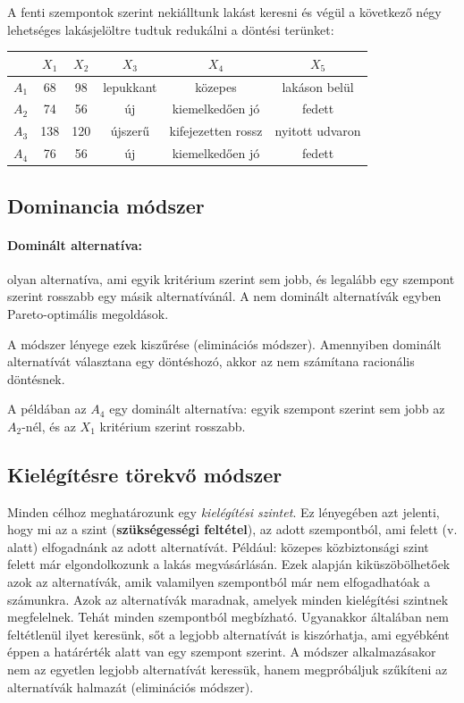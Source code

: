 \documentclass[a4paper,12pt]{article}
\begin{document}
A fenti szempontok szerint nekiálltunk lakást keresni és végül a következő négy lehetséges lakásjelöltre tudtuk redukálni a döntési terünket:
\begin{center}
\begin{tabular}{c||c|c|c|c|c}
 & $X_1$& $X_2$& $X_3$& $X_4$& $X_5$ \\
 \hline
 $A_1$&68  &98 & lepukkant & közepes & lakáson belül \\
 $A_2$&74  &56 & új& kiemelkedően jó& fedett \\
 $A_3$&138  &120 & újszerű & kifejezetten rossz& nyitott udvaron \\
 $A_4$&76  &56 & új& kiemelkedően jó& fedett \\
\end{tabular}
\end{center}

\subsection{Dominancia módszer}

\paragraph{Dominált alternatíva:} olyan alternatíva, ami egyik kritérium szerint sem jobb, és legalább egy szempont szerint rosszabb egy másik alternatívánál.  A nem dominált alternatívák egyben Pareto-optimális megoldások.

A módszer lényege ezek kiszűrése (eliminációs módszer). Amennyiben dominált alternatívát választana egy döntéshozó, akkor az nem számítana racionális döntésnek. 

A példában az $A_4$ egy dominált alternatíva: egyik szempont szerint sem jobb az $A_2$-nél, és az $X_1$ kritérium szerint rosszabb. 

\subsection{Kielégítésre törekvő módszer}

Minden célhoz meghatározunk egy \emph{kielégítési szintet}. Ez lényegében azt jelenti, hogy mi az a szint (\textbf{szükségességi feltétel}), az adott szempontból, ami felett (v. alatt) elfogadnánk az adott alternatívát. Például: közepes közbiztonsági szint felett már elgondolkozunk a lakás megvásárlásán. Ezek alapján kiküszöbölhetőek azok az alternatívák, amik valamilyen szempontból már nem elfogadhatóak a számunkra. Azok az alternatívák maradnak, amelyek minden kielégítési szintnek megfelelnek. Tehát minden szempontból megbízható. Ugyanakkor általában nem feltétlenül ilyet keresünk, sőt a legjobb alternatívát is kiszórhatja, ami egyébként éppen a határérték alatt van egy szempont szerint. A módszer alkalmazásakor nem az egyetlen legjobb alternatívát keressük, hanem megpróbáljuk szűkíteni az alternatívák halmazát (eliminációs módszer). 
\end{document}
